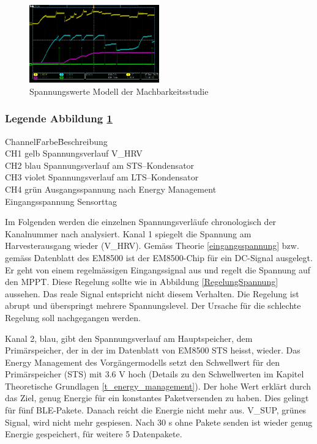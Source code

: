 \begin{figure}[ht]
    \includegraphics[width=0.5\textwidth]{3Vorgehen/imag/messungPA.png}
    \caption{Spannungswerte Modell der Machbarkeitsstudie}\label{spannungMachbarkeit} 
\end{figure}

\subsubsection*{Legende Abbildung \ref{spannungMachbarkeit} }
\begin{tabbing}
    Channel\quad\= Farbe\quad\= Beschreibung\\[0.8ex]
    CH1\> gelb\> Spannungsverlauf V\_HRV\\
    CH2\> blau\> Spannungsverlauf am STS--Kondensator\\
    CH3\> violet\> Spannungsverlauf am LTS--Kondensator\\
    CH4\> grün\> Ausgangsspannung nach Energy Management\\
     \>  \>      Eingangsspannung Sensorttag
\end{tabbing}    

Im Folgenden werden die einzelnen Spannungsverläufe chronologisch der Kanalnummer nach analysiert. Kanal 1 spiegelt die Spannung am Harvesterausgang wieder (V\_HRV). Gemäss Theorie \ref{eingangsspannung} bzw. gemäss Datenblatt des EM8500 ist der EM8500-Chip für ein DC-Signal ausgelegt. Er geht von einem regelmässigen Eingangssignal aus und regelt die Spannung auf den MPPT. Diese Regelung sollte wie in Abbildung \ref{RegelungSpannung} aussehen. Das reale Signal entspricht nicht diesem Verhalten. Die Regelung ist abrupt und überspringt mehrere Spannungslevel. Der Ursache für die schlechte Regelung soll nachgegangen werden.

Kanal 2, blau, gibt den Spannungsverlauf am Hauptspeicher, dem Primärspeicher, der in der im Datenblatt von EM8500 STS heisst, wieder. Das Energy Management des Vorgängermodells setzt den Schwellwert für den Primärspeicher (STS) mit 3.6 V hoch (Details zu den Schwellwerten im Kapitel Theoretische Grundlagen \ref{t_energy_management}). Der hohe Wert erklärt durch das Ziel, genug Energie für ein konstantes Paketversenden zu haben. Dies gelingt für fünf BLE-Pakete. Danach reicht die Energie nicht mehr aus. V\_SUP, grünes Signal, wird nicht mehr gespiesen. Nach 30 s ohne Pakete senden ist wieder genug Energie gespeichert, für weitere 5 Datenpakete.


